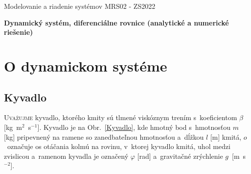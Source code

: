 \documentclass[a4paper, 10pt, ]{article}
\def\oznacenieCasti{MRS02 - ZS2022}
\begin{document}
\lstset{%
style=mystyle,
rangebeginprefix=\#\#\#\ cellB\ ,%
rangebeginsuffix=\ \#\#\#,%
rangeendprefix=\#\#\#\ cellE\ ,%
rangeendsuffix=\ \#\#\#,%
includerangemarker=false,
}




\fontsize{12pt}{22pt}\selectfont

\centerline{\textsf{Modelovanie a riadenie systémov} \hfill \textsf{\oznacenieCasti}}

\fontsize{18pt}{22pt}\selectfont





\begin{flushleft}
	\textbf{\textsf{Dynamický systém, diferenciálne rovnice (analytické a numerické riešenie)}}
\end{flushleft}





\normalsize

\bigskip

{\hypersetup{hidelinks}

\tableofcontents

}

\bigskip

\vspace{18pt}









\section{O dynamickom systéme}



\subsection{Kyvadlo}
\label{castKyvadlo}



\lettrine[lines=3, nindent=0pt]{U}{važujme} kyvadlo, ktorého kmity sú tlmené viskóznym trením s~koeficientom $\beta$ [kg~m$^2$~s$^{-1}$]. Kyvadlo je na Obr.~\ref{Kyvadlo}, kde hmotný bod s~hmotnosťou $m$ [kg] pripevnený na ramene so zanedbateľnou hmotnosťou a~dĺžkou $l$ [m] kmitá, $o$~označuje os otáčania kolmú na rovinu, v~ktorej kyvadlo kmitá, uhol medzi zvislicou a~ramenom kyvadla je označený $\varphi$ [rad] a~gravitačné zrýchlenie $g$~[m~s$^{-2}$].
\end{document}
